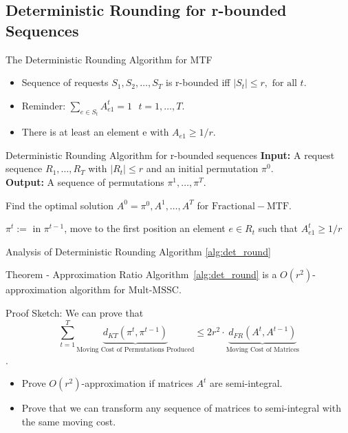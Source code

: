 \documentclass{beamer}
\def\DSSC{\mathrm{Mult}\text{-}\mathrm{MSSC}}
\begin{document}
\subsection{Deterministic Rounding for r-bounded Sequences}

\begin{frame}{The Deterministic Rounding Algorithm for MTF}
    \begin{itemize}
         \item Sequence of requests $S_1, S_2, \ldots, S_T$ is r-bounded iff $|S_t| \leq r, \text{ for all } t$.
         \item Reminder: $\sum_{e \in S_t} A_{e1}^t = 1 ~~~ t = 1,\ldots, T$.
         \item There is at least an element e with $A_{e1} \geq 1/r$.
    \end{itemize}
        \begin{block}{Deterministic Rounding Algorithm for r-bounded sequences}\label{alg:det_round}
            \textbf{Input:} A request sequence $R_1,\ldots,R_T$ with $|R_t| \leq r$ and an initial permutation $\pi^0$.\\
          \textbf{Output:} A sequence of permutations $\pi^1,\ldots,\pi^T$.
        
         \begin{algorithmic}[1]
         \STATE Find the optimal solution $A^0=\pi^0,A^1,\ldots,A^T$ for $\mathrm{Fractional-MTF}$. 
        
         
                      
                \STATE $\pi^t:=$ in $\pi^{t-1}$, move to the first position an element $e \in R_t$
                such that $A_{e1}^t \geq 1/r$
        \ENDFOR
          \end{algorithmic}
         \end{block}
\end{frame}

\begin{frame}{Analysis of Deterministic Rounding Algorithm \ref{alg:det_round}}
        \begin{block}{Theorem - Approximation Ratio}
            Algorithm~\ref{alg:det_round} is a $O(r^2)$-approximation algorithm for $\DSSC$.
        \end{block}
    
    Proof Sketch: We can prove that  $$\sum_{t=1}^T \underbrace{d_{KT} (\pi^t, \pi^{t-1} )}_{\text{Moving Cost of Permutations Produced}} \leq 2r^2 \cdot \underbrace{d_{FR} (A^t, A^{t-1})}_{\text{Moving Cost of Matrices}}$$.
    
    \begin{itemize}
         \item Prove $O(r^2)$-approximation if matrices $A^t$ are semi-integral.
         \item Prove that we can transform any sequence of matrices to semi-integral with the same moving cost.
    \end{itemize}
\end{frame}
\end{document}
